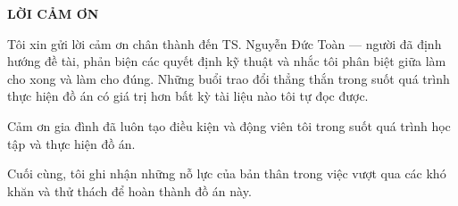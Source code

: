 \documentclass[../DoAn.tex]{subfiles}
\begin{document}
\begin{center}
    \Large{\textbf{LỜI CẢM ƠN}}\\
\end{center}
\vspace{1cm}
Tôi xin gửi lời cảm ơn chân thành đến TS. Nguyễn Đức Toàn — người đã
định hướng đề tài, phản biện các quyết định kỹ thuật và nhắc tôi phân biệt
giữa làm cho xong và làm cho đúng. Những buổi trao đổi
thẳng thắn trong suốt quá trình thực hiện đồ án có giá trị hơn bất kỳ tài
liệu nào tôi tự đọc được.

Cảm ơn gia đình đã luôn tạo điều kiện và động viên tôi trong suốt quá trình học tập và thực hiện đồ án.

Cuối cùng, tôi ghi nhận những nỗ lực của bản thân trong việc vượt qua các khó khăn và thử thách để hoàn thành đồ án này.
\end{document}
